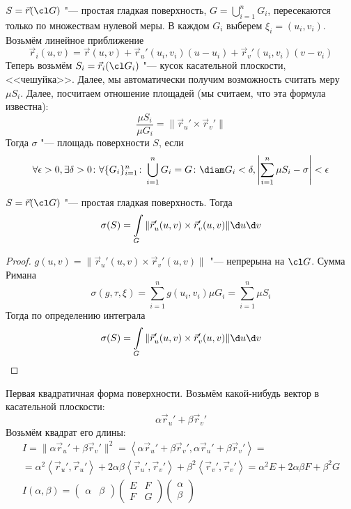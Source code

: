 \begin{Def}
	$S = \vec r(\cl G)$ "--- простая гладкая поверхность, $G = \bigcup_{i=1}^n G_i$, пересекаются только по множествам нулевой меры.
	В каждом $G_i$ выберем $\xi_i = (u_i, v_i)$.
	Возьмём линейное приближение
	\[ \vec r_i(u, v) = \vec r(u, v) + \vec r_u' (u_i, v_i)(u - u_i) + \vec r_v'(u_i, v_i)(v - v_i) \]
	Теперь возьмём $S_i = \vec r_i(\cl G_i)$ "--- кусок касательной плоскости, <<чешуйка>>.
	Далее, мы автоматически получим возможность считать меру $\mu S_i$.
	Далее, посчитаем отношение площадей (мы считаем, что эта формула известна):
	\[ \frac{\mu S_i}{\mu G_i} = \|\vec r_u' \times \vec r_v' \| \]
	Тогда $\sigma$ "--- площадь поверхности $S$, если
	\[
		\forall \epsilon > 0, \exists \delta > 0\colon \forall \{G_i\}_{i=1}^n\colon \bigcup_{i=1}^n G_i = G\colon
		\diam G_i < \delta, \left| \sum_{i=1}^n \mu S_i - \sigma \right| < \epsilon
	\]
\end{Def}

\begin{theorem}
	$S = \vec r(\cl G)$ "--- простая гладкая поверхность.
	Тогда
	\[ \sigma(S) = \int\limits_{G} \|\vec r_u'(u, v) \times \vec r_v'(u, v)\| \d u \d v \]
\end{theorem}
\begin{proof}
	$g(u, v) = \|\vec r_u'(u, v) \times \vec r_v'(u, v)\|$ "--- непрерына на $\cl G$.
	Сумма Римана
	\[
		\sigma(g, \tau, \xi) = \sum_{i=1}^n g(u_i, v_i) \mu G_i = \sum_{i=1}^n \mu S_i
	\]
	Тогда по определению интеграла
	\[ \sigma(S) = \int\limits_{G} \|\vec r_u'(u, v) \times \vec r_v'(u, v)\| \d u \d v \]
\end{proof}

\begin{Def}
	Первая квадратичная форма поверхности.
	Возьмём какой-нибудь вектор в касательной плоскости:
	\[ \alpha \vec r_u' + \beta \vec r_v' \]
	Возьмём квадрат его длины:
	\begin{gather*}
		I = \|\alpha \vec r_u' + \beta \vec r_v'\|^2
		= \left<\alpha \vec r_u' + \beta \vec r_v',\alpha \vec r_u' + \beta \vec r_v'\right> = \\
		= \alpha^2 \left<\vec r_u', \vec r_u'\right> + 2\alpha\beta \left<\vec r_u', \vec r_v'\right> + \beta^2 \left<\vec r_v', \vec r_v'\right>
		= \alpha^2 E + 2\alpha\beta F + \beta^2 G \\
		I(\alpha, \beta)
		= \begin{pmatrix} \alpha & \beta \end{pmatrix} \begin{pmatrix} E & F \\ F & G \end{pmatrix} \begin{pmatrix} \alpha\\\beta \end{pmatrix}
	\end{gather*}
\end{Def}

